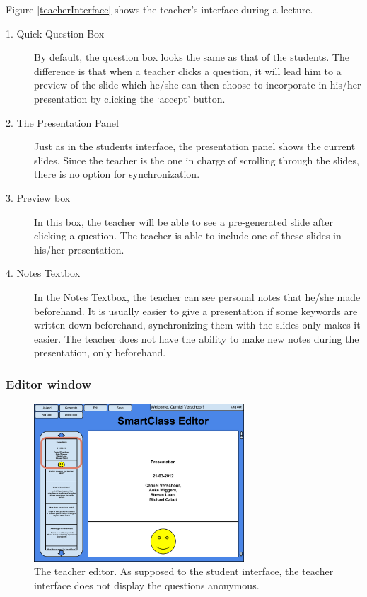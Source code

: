 \documentclass[11pt]{article}
\begin{document}
Figure \ref{teacherInterface} shows the teacher's interface during a lecture.
\begin{description}
\item[1. Quick Question Box] By default, the question box looks the same as that of the students. The difference is that when a teacher clicks a question, it will lead him to a preview of the slide which he/she can then choose to incorporate in his/her presentation by clicking the `accept' button. 
\item[2. The Presentation Panel] Just as in the students interface, the presentation panel shows the current slides. Since the teacher is the one in charge of scrolling through the slides, there is no option for synchronization. 
\item[3. Preview box] In this box, the teacher will be able to see a pre-generated slide after clicking a question. The teacher is able to include one of these slides in his/her presentation. 
\item[4. Notes Textbox] In the Notes Textbox, the teacher can see personal notes that he/she made beforehand. It is usually easier to give a presentation if some keywords are written down beforehand, synchronizing them with the slides only makes it easier. The teacher does not have the ability to make new notes during the presentation, only beforehand.
\end{description}
\subsubsection{Editor window}

\begin{figure}[!h]
\centering
\includegraphics[width=0.7\textwidth]{teacherInterfaceEditor.pdf}
\caption{The teacher editor. As supposed to the student interface, the teacher interface does not display the questions anonymous.}
\label{teacherInterfaceEditor}
\end{figure}
\end{document}
